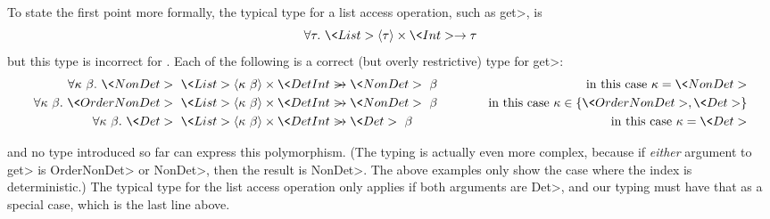 To state the first point more formally, the 
typical type for a list access operation, such as \<get>, is
$$\forallt{\tau} \<List>\angles{\tau} \times \<Int> \rightarrow \tau$$
but this type is incorrect for \ourTypeSystem.  Each of the following is a
correct (but overly restrictive) type for \<get>:
\begin{eqnarray*}
\forallt{\kappa\ \beta} \<NonDet>\ \<List>\angles{\kappa\ \beta} \times \<Det Int>
& \strut\hspace{-1em} \rightarrow \<NonDet>\ \beta
& \mbox{\quad in this case $\kappa = \<NonDet>$} \\
\forallt{\kappa\ \beta} \<OrderNonDet>\ \<List>\angles{\kappa\ \beta} \times \<Det Int>
& \strut\hspace{-1em} \rightarrow \<NonDet>\ \beta
& \mbox{\quad in this case $\kappa \in \{ \<OrderNonDet>, \<Det> \} $} \\
\forallt{\kappa\ \beta} \<Det>\ \<List>\angles{\kappa\ \beta} \times \<Det Int>
& \strut\hspace{-1em} \rightarrow \<Det>\ \beta\phantom{\<Non>}
& \mbox{\quad in this case $\kappa = \<Det>$}
\end{eqnarray*}

\noindent
and no type introduced so far can express this polymorphism.
(The typing is actually even more complex, because if \emph{either}
argument to \<get> is \<OrderNonDet> or \<NonDet>, then the
result is \<NonDet>.  The above examples only show the case where the index
is deterministic.)
The typical type for the list access operation only applies if both
arguments are \<Det>,
and our typing must have that as a special case, which is the last line above.







